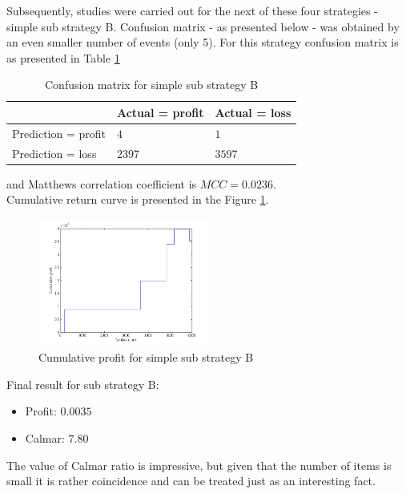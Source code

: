 \documentclass{jtacs}
\begin{document}
Subsequently, studies were carried out for the next of these four strategies - simple sub strategy B. Confusion matrix - as presented below - was obtained by an even smaller number of events (only 5). For this strategy confusion matrix is as presented in Table \ref{tab2}
\begin{table}[ht]
\centering
\caption{Confusion matrix for simple sub strategy B}
\label{tab2}
\begin{tabular}{|l|l|l|}\hline
&	Actual = profit	& Actual = loss\\ \hline
Prediction = profit & $4$	& $1$ \\ \hline
Prediction = loss &	$2397$ &	$3597$ \\ \hline
\end{tabular}
\end{table}
\FloatBarrier
\noindent and Matthews correlation coefficient is $MCC=0.0236$.\\
Cumulative return curve is presented in the Figure \ref{rys4}.
\begin{figure}[ht]
\centering
\includegraphics[width = 0.5\textwidth]{pictures/PivotPointsBp.png}
\caption{Cumulative profit for simple sub strategy B}
\label{rys4}
\end{figure}
\FloatBarrier
\noindent Final result for sub strategy B:
\begin{itemize}
\item Profit: $0.0035$
\item Calmar: $7.80$
\end{itemize}
The value of Calmar ratio is impressive, but given that the number of items is small it is rather coincidence and can be treated just as an interesting fact.\\
\end{document}
